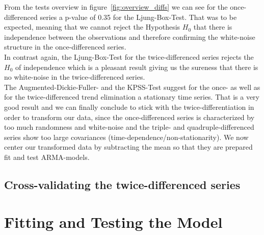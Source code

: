 \documentclass[11pt,a4paper]{article}
\begin{document}
From the tests overview in figure~\ref{fig:overview_diffs}
we can see for the once-differenced series a p-value of 0.35 for the Ljung-Box-Test. That was to be expected, meaning that we cannot reject the Hypothesis $H_0$ that there is independence between the observations \citep{LjungBox78} and therefore confirming the white-noise structure in the once-differenced series. \\
In contrast again, the Ljung-Box-Test for the twice-differenced series rejects the $H_0$ of independence which is a pleasant result giving us the sureness that there is no white-noise in the twice-differenced series.
\\
The Augmented-Dickie-Fuller- and the KPSS-Test suggest for the once- as well as for the twice-differenced trend elimination a stationary time series. That is a very good result and we can finally conclude to stick with the twice-differentiation in order to transform our data, since the once-differenced series is characterized by too much randomness and white-noise and the triple- and quadruple-differenced series show too large covariances (time-dependence/non-stationarity). We now center our transformed data 
by subtracting the mean so that they are prepared fit and test ARMA-models.

\subsection{Cross-validating the twice-differenced series}

\section{Fitting and Testing the Model} \label{Fitting and Testing the Model}
\end{document}
